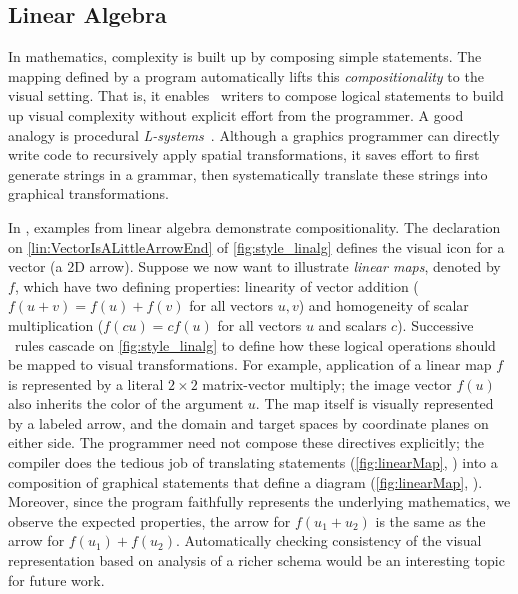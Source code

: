 \subsection{Linear Algebra}
\label{sec:LinearAlgebra}


In mathematics, complexity is built up by composing simple statements. The mapping defined by a \Style{} program automatically lifts this \emph{compositionality} to the visual setting. That is, it enables \Substance\ writers to compose logical statements to build up visual complexity without explicit effort from the \Style{} programmer.  A good analogy is procedural \emph{L-systems}~\cite{Prusinkiewicz:2012:ABP}. Although a graphics programmer can directly write code to recursively apply spatial transformations, it saves effort to first generate strings in a grammar, then systematically translate these strings into graphical transformations.

In \Penrose{}, examples from linear algebra demonstrate compositionality.  The \Style{} declaration on \cref{lin:VectorIsALittleArrowEnd} of \cref{fig:style_linalg} defines the visual icon for a vector (a 2D arrow).  Suppose we now want to illustrate \emph{linear maps}, denoted by \(f\), which have two defining properties: linearity of vector addition (\(f(u+v) = f(u)+f(v)\) for all vectors \(u,v\)) and homogeneity of scalar multiplication (\(f(cu) = cf(u)\) for all vectors \(u\) and scalars \(c\)).  Successive \Style\ rules cascade on \cref{fig:style_linalg} to define how these logical operations  should be mapped to visual transformations.  For example, application of a linear map \(f\) is represented by a literal $2 \times 2$ matrix-vector multiply; the image vector \(f(u)\) also inherits the color of the argument \(u\). The map itself is visually represented by a labeled arrow, and the domain and target spaces by coordinate planes on either side. The \Style{} programmer need not compose these directives explicitly; the compiler does the tedious job of translating \Substance{} statements (\cref{fig:linearMap}, ) into a composition of graphical statements that define a diagram (\cref{fig:linearMap}, ).  Moreover, since the \Style{} program faithfully represents the underlying mathematics, we observe the expected properties, \eg the arrow for \(f(u_1+u_2)\) is the same as the arrow for \(f(u_1)+f(u_2)\).  Automatically checking consistency of the visual representation based on analysis of a richer \Domain{} schema would be an interesting topic for future work.

